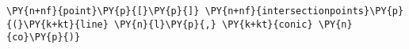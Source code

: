 \begin{Verbatim}[commandchars=\\\{\}]
    \PY{n+nf}{point}\PY{p}{[}\PY{p}{]} \PY{n+nf}{intersectionpoints}\PY{p}{(}\PY{k+kt}{line} \PY{n}{l}\PY{p}{,} \PY{k+kt}{conic} \PY{n}{co}\PY{p}{)}
\end{Verbatim}
